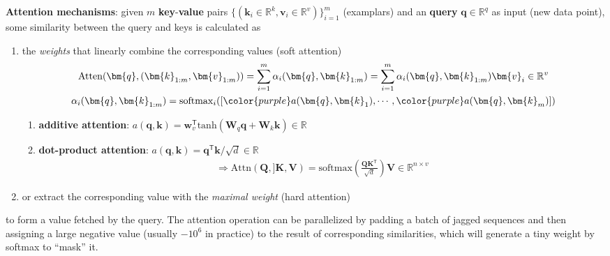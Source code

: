 \textbf{Attention mechanisms}: 
given $m$ \textbf{key}-\textbf{value} pairs $\{(\bm{k}_i\in\mathbb{R}^k,\bm{v}_i\in\mathbb{R}^v)\}_{i=1}^m$ (examplars) and 
an \textbf{query} $\bm{q}\in\mathbb{R}^q$ as input (new data point), some similarity between the query and keys is calculated 
as  
\begin{enumerate}[{(1)}]
    \item the \textit{weights} that linearly combine the corresponding values (soft attention)
    \begin{gather}
        \mathrm{Atten}(\bm{q},(\bm{k}_{1:m},\bm{v}_{1:m}))
        = \sum_{i=1}^m\alpha_i(\bm{q},\bm{k}_{1:m})=\sum_{i=1}^m\alpha_i(\bm{q},\bm{k}_{1:m})\bm{v}_i\in\mathbb{R}^v \\
        \alpha_i(\bm{q},\bm{k}_{1:m})
        = \mathrm{softmax}_i([{\color{purple}a}(\bm{q},\bm{k}_1),\cdots,{\color{purple}a}(\bm{q},\bm{k}_m)])
    \end{gather}
    \begin{enumerate}
        \item \textbf{additive attention}: 
        $a(\bm{q},\bm{k})=\bm{w}_v^\mathsf{T}\mathrm{tanh}(\mathbf{W}_q\bm{q}+\mathbf{W}_k\bm{k})\in\mathbb{R}$
        \item \textbf{dot-product attention}:
        $a(\bm{q},\bm{k})=\bm{q}^\mathsf{T}\bm{k}/\sqrt{d}\in\mathbb{R}$
        \begin{gather}
            \Rightarrow \mathrm{Attn}(\mathbf{Q},]\mathbf{K},\mathbf{V})=\mathrm{softmax}(\frac{\mathbf{QK}^\mathsf{T}}{\sqrt{d}})\mathbf{V}\in\mathbb{R}^{n\times v}
        \end{gather}
    \end{enumerate}
    \item or extract the corresponding value with the \textit{maximal weight} (hard attention)
\end{enumerate}
to form a value fetched by the query.
The attention operation can be parallelized by padding a batch of jagged sequences
and then assigning a large negative value (usually $-10^6$ in practice) to the result of corresponding similarities,
which will generate a tiny weight by softmax to ``mask'' it.


